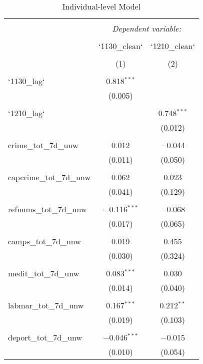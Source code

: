 
\begin{table}[!htbp] \centering 
  \caption{Individual-level Model} 
  \label{} 
\begin{tabular}{@{\extracolsep{5pt}}lcc} 
\\[-1.8ex]\hline 
\hline \\[-1.8ex] 
 & \multicolumn{2}{c}{\textit{Dependent variable:}} \\ 
\cline{2-3} 
\\[-1.8ex] & `1130\_clean` & `1210\_clean` \\ 
\\[-1.8ex] & (1) & (2)\\ 
\hline \\[-1.8ex] 
 `1130\_lag` & 0.818$^{***}$ &  \\ 
  & (0.005) &  \\ 
  & & \\ 
 `1210\_lag` &  & 0.748$^{***}$ \\ 
  &  & (0.012) \\ 
  & & \\ 
 crime\_tot\_7d\_unw & 0.012 & $-$0.044 \\ 
  & (0.011) & (0.050) \\ 
  & & \\ 
 capcrime\_tot\_7d\_unw & 0.062 & 0.023 \\ 
  & (0.041) & (0.129) \\ 
  & & \\ 
 refnums\_tot\_7d\_unw & $-$0.116$^{***}$ & $-$0.068 \\ 
  & (0.017) & (0.065) \\ 
  & & \\ 
 camps\_tot\_7d\_unw & 0.019 & 0.455 \\ 
  & (0.030) & (0.324) \\ 
  & & \\ 
 medit\_tot\_7d\_unw & 0.083$^{***}$ & 0.030 \\ 
  & (0.014) & (0.040) \\ 
  & & \\ 
 labmar\_tot\_7d\_unw & 0.167$^{***}$ & 0.212$^{**}$ \\ 
  & (0.019) & (0.103) \\ 
  & & \\ 
 deport\_tot\_7d\_unw & $-$0.046$^{***}$ & $-$0.015 \\ 
  & (0.010) & (0.054) \\ 

\end{tabular}
\end{table}
